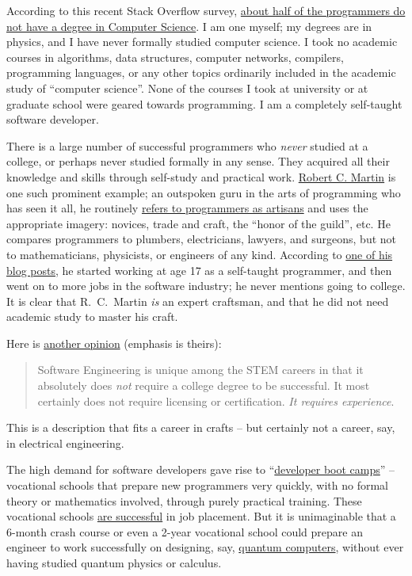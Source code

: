 According to this recent Stack Overflow survey, \href{https://thenextweb.com/insider/2016/04/23/dont-need-go-college-anymore-programmer/}{about half of the programmers do not have a degree in Computer Science}.
I am one myself; my degrees are in physics, and I have never formally
studied computer science. I took no academic courses in algorithms,
data structures, computer networks, compilers, programming languages,
or any other topics ordinarily included in the academic study of ``computer
science''. None of the courses I took at university or at graduate
school were geared towards programming. I am a completely self-taught
software developer.

There is a large number of successful programmers who \emph{never}
studied at a college, or perhaps never studied formally in any sense.
They acquired all their knowledge and skills through self-study and
practical work. \href{https://en.wikipedia.org/wiki/Robert_C._Martin}{Robert C. Martin}
is one such prominent example; an outspoken guru in the arts of programming
who has seen it all, he routinely \href{https://blog.cleancoder.com/uncle-bob/2013/02/01/The-Humble-Craftsman.html}{refers to programmers as artisans}
and uses the appropriate imagery: novices, trade and craft, the ``honor
of the guild'', etc. He compares programmers to plumbers, electricians,
lawyers, and surgeons, but not to mathematicians, physicists, or engineers
of any kind. According to \href{https://blog.cleancoder.com/uncle-bob/2013/11/25/Novices-Coda.html}{one of his blog posts},
he started working at age 17 as a self-taught programmer, and then
went on to more jobs in the software industry; he never mentions going
to college. It is clear that R.~C.~Martin \emph{is} an expert craftsman,
and that he did not need academic study to master his craft.

Here is \href{https://www.quora.com/Can-you-become-a-software-engineer-without-actually-going-to-university-college-How}{another opinion}
(emphasis is theirs):
\begin{quotation}
Software Engineering is unique among the STEM careers in that it absolutely
does \emph{not} require a college degree to be successful. It most
certainly does not require licensing or certification. \emph{It requires
experience}.
\end{quotation}
This is a description that fits a career in crafts – but certainly
not a career, say, in electrical engineering.

The high demand for software developers gave rise to ``\href{https://cvbj.biz/2018/03/15/demand-software-developers-continues-soar-heres-cheapest-free-way-start-tech-career/}{developer boot camps}''
– vocational schools that prepare new programmers very quickly, with
no formal theory or mathematics involved, through purely practical
training. These vocational schools \href{https://www.fullstackacademy.com/blog/why-are-some-coding-bootcamps-job-placement-rates-so-high}{are successful}
in job placement. But it is unimaginable that a 6-month crash course
or even a 2-year vocational school could prepare an engineer to work
successfully on designing, say, \href{https://www.dwavesys.com/quantum-computing}{quantum computers},
without ever having studied quantum physics or calculus.

